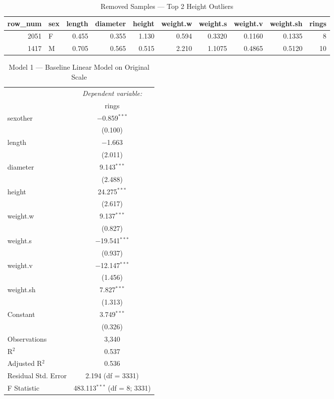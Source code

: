 \documentclass[12pt]{article}
\begin{document}
	\begin{table}[!h]
		\centering
		\caption{\label{tab:outliers}Removed Samples — Top 2 Height Outliers}
		\begin{tabular}{r l r r r r r r r r}
			\toprule
			row\_num & sex & length & diameter & height & weight.w & weight.s & weight.v & weight.sh & rings\\
			\midrule
			2051 & F & 0.455 & 0.355 & 1.130 & 0.594 & 0.3320 & 0.1160 & 0.1335 & 8\\
			1417 & M & 0.705 & 0.565 & 0.515 & 2.210 & 1.1075 & 0.4865 & 0.5120 & 10\\
			\bottomrule
		\end{tabular}
	\end{table}
	
	\begin{table}[!htbp]
		\centering
		\caption{Model 1 — Baseline Linear Model on Original Scale}
		\label{tab:fit1}
		\begin{tabular}{@{\extracolsep{5pt}}lc}
			\toprule
			& \multicolumn{1}{c}{\textit{Dependent variable:}} \\
			\cmidrule(lr){2-2}
			& rings \\
			\midrule
			sexother   & $-$0.859$^{***}$ \\ 
			& (0.100) \\[0.4ex]
			length     & $-$1.663 \\ 
			& (2.011) \\[0.4ex]
			diameter   & 9.143$^{***}$ \\ 
			& (2.488) \\[0.4ex]
			height     & 24.275$^{***}$ \\ 
			& (2.617) \\[0.4ex]
			weight.w   & 9.137$^{***}$ \\ 
			& (0.827) \\[0.4ex]
			weight.s   & $-$19.541$^{***}$ \\ 
			& (0.937) \\[0.4ex]
			weight.v   & $-$12.147$^{***}$ \\ 
			& (1.456) \\[0.4ex]
			weight.sh  & 7.827$^{***}$ \\ 
			& (1.313) \\[0.4ex]
			Constant   & 3.749$^{***}$ \\ 
			& (0.326) \\[0.4ex]
			\midrule
			Observations        & 3,340 \\ 
			R$^{2}$             & 0.537 \\ 
			Adjusted R$^{2}$    & 0.536 \\ 
			Residual Std. Error & 2.194 (df = 3331) \\ 
			F Statistic         & 483.113$^{***}$ (df = 8; 3331) \\ 
			\bottomrule
		\end{tabular}
	\end{table}
	
\end{document}
